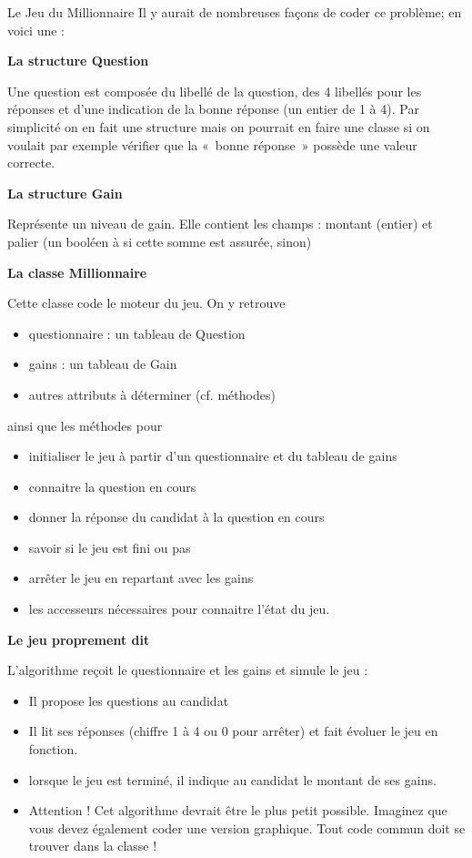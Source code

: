 \begin{Exercice}{Le Jeu du Millionnaire}
	Il y aurait de nombreuses façons de coder ce problème; en voici une :

	{\bfseries
	La structure Question}

	Une question est composée du libellé de la question, des 4 libellés pour
	les réponses et d’une indication de la bonne réponse (un entier de 1 à
	4). Par simplicité on en fait une structure mais on pourrait en faire
	une classe si on voulait par exemple vérifier que la «~bonne réponse~»
	possède une valeur correcte.

	{\bfseries
	La structure Gain}

	Représente un niveau de gain. Elle contient les champs :
	montant (entier) et palier (un booléen à
	 si cette somme est
	assurée,  sinon)

	{\bfseries
	La classe Millionnaire}

	Cette classe code le moteur du jeu. On y retrouve

	\begin{itemize}
		\item 
			questionnaire : un tableau de Question
		\item 
			gains : un tableau de Gain
		\item 
			autres attributs à déterminer (cf. méthodes)
	\end{itemize}
	
	ainsi que les méthodes pour

	\begin{itemize}
		\item 
			initialiser le jeu à partir d’un questionnaire
			et du tableau de gains
		\item 
			connaitre la question en cours
		\item 
			donner la réponse du candidat à la question en
			cours
		\item 
			savoir si le jeu est fini ou pas
		\item 
			arrêter le jeu en repartant avec les gains
		\item 
			les accesseurs nécessaires pour connaitre
			l’état du jeu.
	\end{itemize}
	
	{\bfseries
	Le jeu proprement dit}

	L'algorithme  reçoit le
	questionnaire et les gains et simule le jeu :

	\begin{itemize}
	\item 
		Il propose les questions au candidat
	\item 
		Il lit ses réponses (chiffre 1 à 4 ou 0 pour
		arrêter) et fait évoluer le jeu en fonction.
	\item 
		lorsque le jeu est terminé, il indique au
		candidat le montant de ses gains.
	\item 
		Attention ! Cet algorithme devrait être le plus
		petit possible. Imaginez que vous devez également coder une version
		graphique. Tout code commun doit se trouver dans la classe
	!
	\end{itemize}
\end{Exercice}

